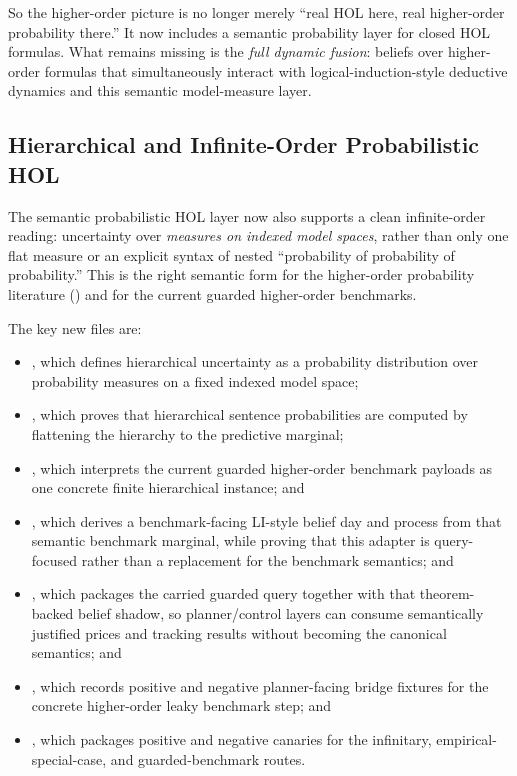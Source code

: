 \documentclass[11pt,openany]{report}
\begin{document}
So the higher-order picture is no longer merely ``real HOL here, real
higher-order probability there.''  It now includes a semantic probability layer
for closed HOL formulas.  What remains missing is the \emph{full dynamic
fusion}: beliefs over higher-order formulas that simultaneously interact with
logical-induction-style deductive dynamics and this semantic model-measure
layer.

\subsection{Hierarchical and Infinite-Order Probabilistic HOL}

The semantic probabilistic HOL layer now also supports a clean
infinite-order reading: uncertainty over \emph{measures on indexed model
spaces}, rather than only one flat measure or an explicit syntax of nested
``probability of probability of probability.''  This is the right semantic form
for the higher-order probability literature
(\cite{Kyburg1988,Gaifman1986HigherOrder,AtkinsonPeijnenburg2013InfiniteOrder})
and for the current guarded higher-order benchmarks.

The key new files are:
\begin{itemize}
\item {},
  which defines hierarchical uncertainty as a probability distribution over
  probability measures on a fixed indexed model space;
\item {}, which
  proves that hierarchical sentence probabilities are computed by flattening the
  hierarchy to the predictive marginal;
\item {}, which
  interprets the current guarded higher-order benchmark payloads as one concrete
  finite hierarchical instance; and
\item {},
  which derives a benchmark-facing LI-style belief day and process from that
  semantic benchmark marginal, while proving that this adapter is
  query-focused rather than a replacement for the benchmark semantics; and
\item {}, which packages
  the carried guarded query together with that theorem-backed belief shadow, so
  planner/control layers can consume semantically justified prices and tracking
  results without becoming the canonical semantics; and
\item {}, which
  records positive and negative planner-facing bridge fixtures for the concrete
  higher-order leaky benchmark step; and
\item {},
  which packages positive and negative canaries for the infinitary,
  empirical-special-case, and guarded-benchmark routes.
\end{itemize}
\end{document}
